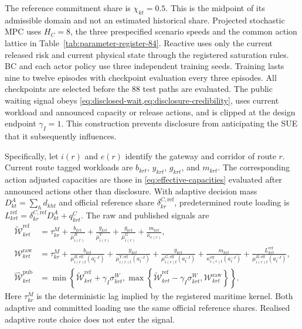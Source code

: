 \documentclass[a4paper,fleqn]{cas-sc}
\begin{document}
The reference commitment share is $\chi_{kt}=0.5$. This is the midpoint of its
admissible domain and not an estimated historical share. Projected stochastic
MPC uses $H_C=8$, the three prespecified scenario speeds and the common action
lattice in Table~\ref{tab:parameter-register-84}. Reactive uses only the current
released risk and current physical state through the registered saturation
rules. BC and each actor policy use three independent training seeds. Training
lasts nine to twelve episodes with checkpoint evaluation every three episodes.
All checkpoints are selected before the 88 test paths are evaluated. The
public waiting signal obeys
\cref{eq:disclosed-wait,eq:disclosure-credibility}, uses current workload and
announced capacity or release actions, and is clipped at the design endpoint
$\gamma_I=1$. This construction prevents disclosure from anticipating the SUE
that it subsequently influences.

Specifically, let $i(r)$ and $e(r)$ identify the gateway and corridor of route
$r$. Current route tagged workloads are $b_{krt}$, $y_{krt}$, $g_{krt}$, and
$m_{krt}$. The corresponding action adjusted capacities are those in
\cref{eq:effective-capacities} evaluated after announced actions other than
disclosure. With adaptive decision mass $D^A_{kt}=\sum_h d_{kht}$ and official
reference share $\delta^{C,\mathrm{ref}}_{kr}$, predetermined route loading is
$L^{\mathrm{ref}}_{krt}=\delta^{C,\mathrm{ref}}_{kr}D^A_{kt}+q^C_{krt}$.
The raw and published signals are
\begin{equation}
 \begin{split}
 \widetilde{\mathcal W}^{\mathrm{ref}}_{krt}
 &=\tau^M_{kr}
 +\frac{b_{krt}}{\bar\mu^B_{i(r)}}
 +\frac{y_{krt}}{\bar\mu^Y_{i(r)}}
 +\frac{g_{krt}}{\bar\mu^G_{i(r)}}
 +\frac{m_{krt}}{\bar\kappa_{e(r)}},\\
 \mathcal W^{\mathrm{raw}}_{krt}
 &=\tau^M_{kr}
 +\frac{b_{krt}}{\mu^{B,\mathrm{eff}}_{i(r)t}(a_t^{-I})}
 +\frac{y_{krt}}{\mu^{Y,\mathrm{eff}}_{i(r)t}(a_t^{-I})}
 +\frac{g_{krt}}{\mu^{G,\mathrm{eff}}_{i(r)t}(a_t^{-I})}
 +\frac{m_{krt}}{\kappa^{\mathrm{eff}}_{e(r)t}(a_t^{-I})}
 +\frac{L^{\mathrm{ref}}_{krt}}
 {\mu^{B,\mathrm{eff}}_{i(r)t}(a_t^{-I})},\\
 \widehat{\mathcal W}^{\mathrm{pub}}_{krt}
 &=\min\!\left\{\widetilde{\mathcal W}^{\mathrm{ref}}_{krt}
 +\gamma_I\sigma^W_{krt},
 \max\!\left\{\widetilde{\mathcal W}^{\mathrm{ref}}_{krt}
 -\gamma_I\sigma^W_{krt},
 \mathcal W^{\mathrm{raw}}_{krt}\right\}\right\}.
 \end{split}
 \label{eq:522-public-wait-signal}
\end{equation}
Here $\tau^M_{kr}$ is the deterministic lag implied by the registered maritime
kernel. Both adaptive and committed loading use the same official reference
shares. Realised adaptive route choice
does not enter the signal.
\end{document}
